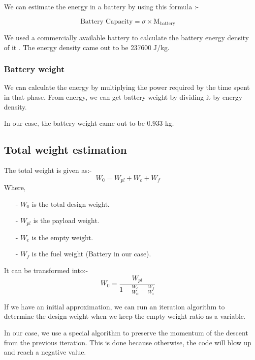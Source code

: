 \documentclass[12 pt]{article}
\begin{document}
We can estimate the energy in a battery by using this formula \cite{Lipobattery}:-

$$ \text{Battery Capacity} = \sigma \times \text{M}_\text{battery} $$

We used a commercially available battery to calculate the battery energy density of it \cite{Batteryref}. The energy density came out to be 237600 J/kg.

\subsubsection{Battery weight}

We can calculate the energy by multiplying the power required by the time spent in that phase. From energy, we can get battery weight by dividing it by energy density. 

In our case, the battery weight came out to be 0.933 kg.


\subsection{Total weight estimation}

The total weight is given as:- 
$$ W_0 = W_{pl} + W_{e} + W_{f} $$
Where,
\begin{itemize}
    \item[-] $W_0$ is the total design weight.
    \item [-] $W_{pl}$ is the payload weight.
    \item [-] $W_{e}$ is the empty weight.
    \item [-] $W_{f}$ is the fuel weight (Battery in our case).
\end{itemize}

It can be transformed into:- 
$$W_{0} = \frac{W_{pl}}{1 - \frac{W_{e}}{W_{0}} - \frac{W_{f}}{W_0}}$$

If we have an initial approximation, we can run an iteration algorithm to determine the design weight when we keep the empty weight ratio as a variable.


In our case, we use a special algorithm to preserve the momentum of the descent from the previous iteration. This is done because otherwise, the code will blow up and reach a negative value. 
\end{document}
